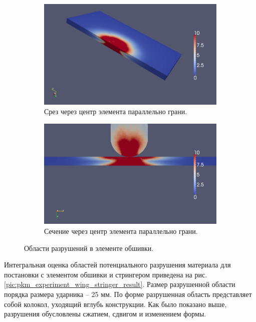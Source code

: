\begin{figure}[htp]
\begin{subfigure}[b]{\textwidth}
\centering
\includegraphics[width=\textwidth]{png/pkm-experiment/wing-only/sum-3d.png}
\caption{Срез через центр элемента параллельно грани.}
\end{subfigure}
\begin{subfigure}[b]{\textwidth}
\centering
\includegraphics[width=\textwidth]{png/pkm-experiment/wing-only/sum.png}
\caption{Сечение через центр элемента параллельно грани.}
\end{subfigure}
\caption{Области разрушений в элементе обшивки.}
\label{pic:pkm_experiment_wing_only_result}
\end{figure}

Интегральная оценка областей потенциального разрушения материала для постановки с элементом обшивки и стрингером приведена на рис. \ref{pic:pkm_experiment_wing_stringer_result}. Размер разрушенной области порядка размера ударника -- 25 мм. По форме разрушенная область представляет собой колокол, уходящий вглубь конструкции. Как было показано выше, разрушения обусловлены сжатием, сдвигом и изменением формы.

